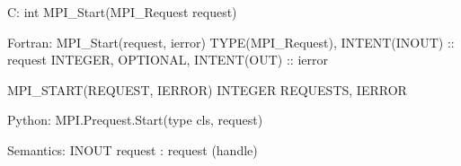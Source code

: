 C:
int MPI_Start(MPI_Request request)

Fortran:
MPI_Start(request, ierror)
TYPE(MPI_Request), INTENT(INOUT) :: request
INTEGER, OPTIONAL, INTENT(OUT) :: ierror

MPI_START(REQUEST, IERROR)
INTEGER REQUESTS, IERROR

Python:
MPI.Prequest.Start(type cls, request)

Semantics:
INOUT request : request (handle)
